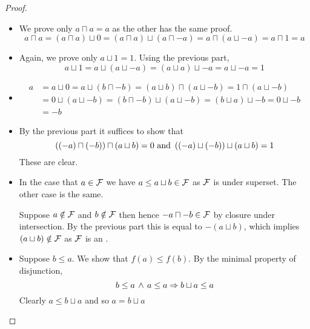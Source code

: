 \begin{proof}~
    \begin{itemize}
        \item We prove only $a \sqcap a = a$ as the other has the same proof.
            \[a \sqcap a = (a \sqcap a) \sqcup 0 = (a \sqcap a) \sqcup (a \sqcap - a)
            = a \sqcap (a \sqcup - a) = a \sqcap 1 = a\]
        \item Again, we prove only $a \sqcup 1 = 1$. Using the previous part,
            \[a \sqcup 1 = a \sqcup (a \sqcup - a) = (a \sqcup a) \sqcup - a
            = a \sqcup - a = 1\]
        \item \begin{align*}
            a &= a \sqcup 0 = a \sqcup (b \sqcap - b) = 
            (a \sqcup b) \sqcap (a \sqcup - b) = 1 \sqcap (a \sqcup - b)\\
            &= 0 \sqcup (a \sqcup - b) = (b \sqcap - b) \sqcup (a \sqcup - b)
            = (b \sqcup a) \sqcup - b = 0 \sqcup - b \\
            &= - b
        \end{align*} 
        \item By the previous part it suffices to show that 
            \[\left((- a) \sqcap (- b)\right) \sqcap (a \sqcup b) = 0 \text{ and }
            \left((- a) \sqcup (- b) \right) \sqcup (a \sqcup b) = 1\]
            These are clear.
        \item \begin{forward}
            In the case that $a \in \mathcal{F}$ we have $a \leq a \sqcup b \in \mathcal{F}$ 
            as $\mathcal{F}$ is under superset. 
            The other case is the same.
        \end{forward}
        \begin{backward}
            Suppose $a \notin \mathcal{F}$ and $b \notin \mathcal{F}$ then
             hence $- a \sqcap - b \in \mathcal{F}$
                by closure under intersection. 
                By the previous part this is equal to $- (a \sqcup b)$,
                which implies $(a \sqcup b) \notin \mathcal{F}$ as $\mathcal{F}$ 
                is an .
        \end{backward}
        \item Suppose $b \leq a$. 
            We show that $f(a) \leq f(b)$.
            By the minimal property of disjunction,
            \[b \leq a \, \land \, a \leq a \Rightarrow b \sqcup a \leq a\]
            Clearly $a \leq b \sqcup a$ and so $a = b \sqcup a$

\end{itemize}
\end{proof}

